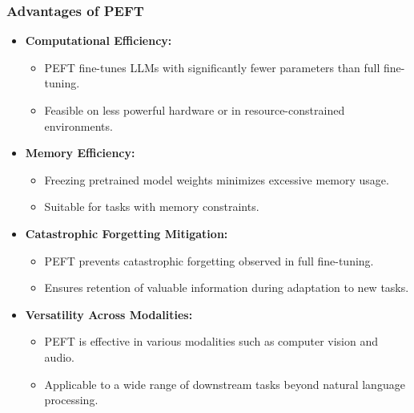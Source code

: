\begin{frame}[fragile]\frametitle{Advantages of PEFT}
  \begin{itemize}
    \item \textbf{Computational Efficiency:}
      \begin{itemize}
        \item PEFT fine-tunes LLMs with significantly fewer parameters than full fine-tuning.
        \item Feasible on less powerful hardware or in resource-constrained environments.
      \end{itemize}
    \item \textbf{Memory Efficiency:}
      \begin{itemize}
        \item Freezing pretrained model weights minimizes excessive memory usage.
        \item Suitable for tasks with memory constraints.
      \end{itemize}
    \item \textbf{Catastrophic Forgetting Mitigation:}
      \begin{itemize}
        \item PEFT prevents catastrophic forgetting observed in full fine-tuning.
        \item Ensures retention of valuable information during adaptation to new tasks.
      \end{itemize}
    \item \textbf{Versatility Across Modalities:}
      \begin{itemize}
        \item PEFT is effective in various modalities such as computer vision and audio.
        \item Applicable to a wide range of downstream tasks beyond natural language processing.
      \end{itemize}
  \end{itemize}
\end{frame}

